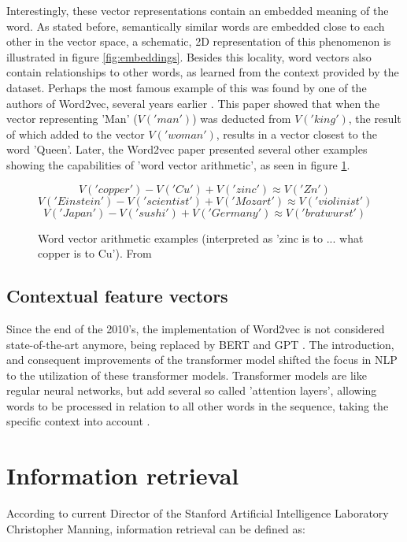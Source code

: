 \documentclass[twoside]{uva-inf-bachelor-thesis}
\begin{document}
Interestingly, these vector representations contain an embedded meaning of the word. As stated before, semantically similar words are embedded close to each other in the vector space, a schematic, 2D representation of this phenomenon is illustrated in figure \ref{fig:embeddings}. Besides this locality, word vectors also contain relationships to other words, as learned from the context provided by the dataset. Perhaps the most famous example of this was found by one of the authors of Word2vec, several years earlier \cite{mikolov13_2}. This paper showed that when the vector representing 'Man' ($V('man')$) was deducted from $V('king')$, the result of which added to the vector $V('woman')$, results in a vector closest to the word 'Queen'. Later, the Word2vec paper presented several other examples showing the capabilities of 'word vector arithmetic', as seen in figure \ref{fig:vecarith}.
\begin{figure}[h]
    \centering
    $$V('copper') - V('Cu') + V('zinc') \approx V('Zn')$$
    $$V('Einstein') - V('scientist') + V('Mozart') \approx V('violinist')$$
    $$V('Japan') - V('sushi') + V('Germany') \approx V('bratwurst')$$
    \caption{Word vector arithmetic examples (interpreted as 'zinc is to ... what copper is to Cu'). From \cite{mikolov13}}
    \label{fig:vecarith}
\end{figure}

\subsection{Contextual feature vectors}

Since the end of the 2010's, the implementation of Word2vec is not considered state-of-the-art anymore, being replaced by BERT \cite{devlin19} and GPT \cite{brown20}. The introduction, and consequent improvements of the transformer model shifted the focus in NLP to the utilization of these transformer models. Transformer models are like regular neural networks, but add several so called 'attention layers', allowing words to be processed in relation to all other words in the sequence, taking the specific context into account \cite{vaswani17, vondermosel22}.

\section{Information retrieval} \label{retrievalSection}
According to current Director of the Stanford Artificial Intelligence Laboratory Christopher Manning, information retrieval can be defined as: 
\end{document}
